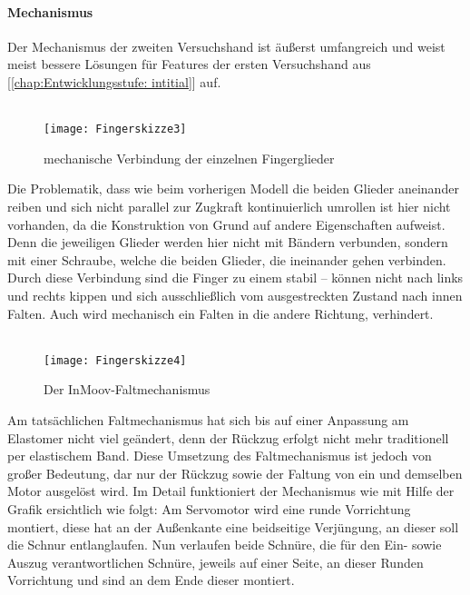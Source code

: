 \documentclass[titlepage,12pt,twoside]{article}
\begin{document}
\paragraph{Mechanismus}
\label{par:Mechanismus_zweite_Hand}
\hfill \break
\hfill \break
Der Mechanismus der zweiten Versuchshand  ist äußerst umfangreich und weist meist bessere Lösungen für Features der ersten Versuchshand aus [\textcolor{blue}{\autoref{chap:Entwicklungsstufe: intitial}}] auf. \\
\\
\begin{figure}[H]
	\begin{center}
		\scalebox{1}
		{\texttt{[image: Fingerskizze3]}}
		\caption{mechanische Verbindung der einzelnen Fingerglieder}
		\label{fig:Fingerskizze3}			
	\end{center}
\end{figure}
\hfill \break
Die Problematik, dass wie beim vorherigen Modell die beiden Glieder aneinander reiben und sich nicht parallel zur Zugkraft kontinuierlich umrollen ist hier nicht vorhanden, da die Konstruktion von Grund auf andere Eigenschaften aufweist. 
Denn die jeweiligen Glieder werden hier nicht mit Bändern verbunden, sondern mit einer Schraube, welche die beiden Glieder, die ineinander gehen verbinden. Durch diese Verbindung sind die Finger zu einem stabil – können nicht nach links und 
rechts kippen und sich ausschließlich vom ausgestreckten Zustand nach innen Falten. Auch wird mechanisch ein Falten in die andere Richtung, verhindert. \\
\\
\begin{figure}[H]
	\begin{center}
		\scalebox{1.1}
		{\texttt{[image: Fingerskizze4]}}
		\caption{Der InMoov-Faltmechanismus}
		\label{fig:Fingerskizze4}			
	\end{center}
\end{figure}
\hfill \break
Am tatsächlichen Faltmechanismus hat sich bis auf einer Anpassung am Elastomer nicht viel geändert, denn der Rückzug erfolgt nicht mehr traditionell per elastischem Band. Diese Umsetzung des Faltmechanismus ist jedoch von großer Bedeutung, dar 
nur der Rückzug sowie der Faltung von ein und demselben Motor ausgelöst wird. Im Detail funktioniert der Mechanismus wie mit Hilfe der Grafik ersichtlich wie folgt: Am Servomotor wird eine runde Vorrichtung montiert, diese hat an der Außenkante 
eine beidseitige Verjüngung, an dieser soll die Schnur entlanglaufen. Nun verlaufen beide Schnüre, die für den Ein- sowie Auszug verantwortlichen Schnüre, jeweils auf einer Seite, an dieser Runden Vorrichtung und sind an dem Ende dieser montiert. 
\end{document}
